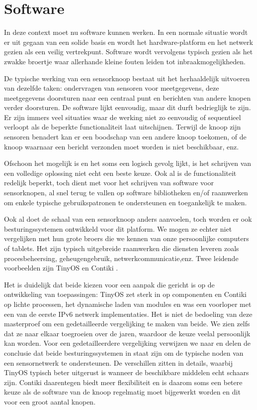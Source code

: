 \section{Software}
\label{section:problem-software}

In deze context moet nu software kunnen werken. In een normale situatie wordt
er uit gegaan van een solide basis en wordt het hardware-platform en het
netwerk gezien als een veilig vertrekpunt. Software wordt vervolgens typisch
gezien als het zwakke broertje waar allerhande kleine fouten leiden tot
inbraakmogelijkheden.

De typische werking van een sensorknoop bestaat uit het herhaaldelijk uitvoeren
van dezelfde taken: ondervragen van sensoren voor meetgegevens, deze
meetgegevens doorsturen naar een centraal punt en berichten van andere knopen
verder doorsturen. De software lijkt eenvoudig, maar dit durft bedrieglijk te
zijn. Er zijn immers veel situaties waar de werking niet zo eenvoudig of
sequentieel verloopt als de beperkte functionaliteit laat uitschijnen. Terwijl
de knoop zijn sensoren benadert kan er een boodschap van een andere knoop
toekomen, of de knoop waarnaar een bericht verzonden moet worden is niet
beschikbaar, enz.

Ofschoon het mogelijk is en het soms een logisch gevolg lijkt, is het schrijven
van een volledige oplossing niet echt een beste keuze. Ook al is de
functionaliteit redelijk beperkt, toch dient met voor het schrijven van
software voor sensorknopen, al snel terug te vallen op software bibliotheken
en/of raamwerken om enkele typische gebruikspatronen te ondersteunen en
toegankelijk te maken.

Ook al doet de schaal van een sensorknoop anders aanvoelen, toch worden er ook
besturingssystemen ontwikkeld voor dit platform. We mogen ze echter niet
vergelijken met hun grote broers die we kennen van onze persoonlijke computers
of tablets. Het zijn typisch uitgebreide raamwerken die diensten leveren zoals
procesbeheersing, geheugengebruik, netwerkcommunicatie,enz. Twee leidende
voorbeelden zijn TinyOS \citep{levis2005tinyos} en Contiki
\citep{dunkels2004contiki}.

Het is duidelijk dat beide kiezen voor een aanpak die gericht is op de
ontwikkeling van toepassingen: TinyOS zet sterk in op componenten en Contiki op
lichte processen, het dynamische laden van modules en was een voorloper met een
van de eerste IPv6 netwerk implementaties. Het is niet de bedoeling van deze
masterproef om een gedetailleerde vergelijking te maken van beide. We zien zelfs dat
ze naar elkaar toegroeien over de jaren, waardoor de keuze veelal persoonlijk
kan worden. Voor een gedetailleerdere vergelijking verwijzen we naar
\citep{reusing2012comparison} en delen de conclusie dat beide
besturingssystemen in staat zijn om de typische noden van een sensornetwerk te
ondersteunen. De verschillen zitten in details, waarbij TinyOS typisch beter
uitgerust is wanneer de beschikbare middelen echt schaars zijn. Contiki
daarentegen biedt meer flexibiliteit en is daarom soms een betere keuze als de
software van de knoop regelmatig moet bijgewerkt worden en dit voor een groot
aantal knopen.

